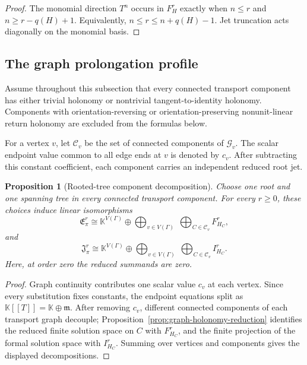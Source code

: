 \documentclass[11pt]{article}
\theoremstyle{plain}
\newtheorem{proposition}[theorem]{Proposition}
\theoremstyle{definition}
\begin{document}
\begin{proof}
The monomial direction \(T^n\) occurs in \(F_H^r\) exactly when \(n\leq r\) and
\(n\geq r-q(H)+1\).
Equivalently,
\(n\leq r\leq n+q(H)-1\).
Jet truncation acts diagonally on the monomial basis.
\end{proof}



\subsection{The graph prolongation profile}
\label{subsec:graph-prolongation-profile}

Assume throughout this subsection that every connected transport
component has either trivial holonomy or nontrivial
tangent-to-identity holonomy. Components with orientation-reversing or
orientation-preserving nonunit-linear return holonomy are excluded
from the formulas below.

For a vertex \(v\), let \(\mathscr C_v\) be the set of connected components of \(\mathcal G_v\). The scalar
endpoint value common to all edge ends at \(v\) is denoted by \(c_v\).
After subtracting this constant coefficient, each component carries an
independent reduced root jet.

\begin{proposition}[Rooted-tree component decomposition]
\label{prop:rooted-tree-component-decomposition}
Choose one root and one spanning tree in every connected transport
component. For every \(r\geq0\), these choices induce linear
isomorphisms
\[
  \mathfrak E_\pi^r
  \cong
  \mathbb K^{V(\Gamma)}
  \oplus
  \bigoplus_{v\in V(\Gamma)}
  \;
  \bigoplus_{C\in\mathscr C_v}
  F_{H_C}^r,
\]
and
\[
  \mathfrak J_\pi^r
  \cong
  \mathbb K^{V(\Gamma)}
  \oplus
  \bigoplus_{v\in V(\Gamma)}
  \;
  \bigoplus_{C\in\mathscr C_v}
  I_{H_C}^r.
\]
Here, at order zero the reduced summands are zero.
\end{proposition}

\begin{proof}
Graph continuity contributes one scalar value \(c_v\) at each vertex. Since every substitution fixes constants, the endpoint equations split as \(\mathbb K[[T]]=\mathbb K\oplus\mathfrak m\). After removing \(c_v\), different connected components of each transport graph decouple; Proposition~\ref{prop:graph-holonomy-reduction} identifies the reduced finite solution space on \(C\) with \(F_{H_C}^r\), and the finite projection of the formal solution space with \(I_{H_C}^r\). Summing over vertices and components gives the displayed decompositions.
\end{proof}
\end{document}
